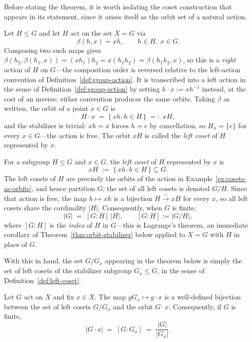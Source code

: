 \documentclass[mathematics,review,submit,moreauthors]{Definitions/mdpi}
\begin{document}
Before stating the theorem, it is worth isolating the coset construction
that appears in its statement, since it arises itself as the orbit set of a
natural action.

\begin{Example}
\label{ex:cosets-as-orbits}
Let $H \leq G$ and let $H$ act on the set $X = G$ via
\[
    \beta(h,x) = x h, \qquad h \in H,\ x \in G.
\]
Composing two such maps gives $\beta(h_2, \beta(h_1,x)) = (x h_1) h_2 = x(h_1 h_2) = \beta(h_1 h_2, x)$,
so this is a \emph{right} action of $H$ on $G$---the composition order is
reversed relative to the left-action convention of
Definition~\ref{def:group-action}. It is transcribed into a left action in
the sense of Definition~\ref{def:group-action} by setting
$h \cdot x := x h^{-1}$ instead, at the cost of an inverse; either
convention produces the same orbits. Taking $\beta$ as written, the orbit of
a point $x \in G$ is
\[
    H \cdot x \;=\; \{\, xh : h \in H \,\} \;=:\; xH,
\]
and the stabilizer is trivial: $xh = x$ forces $h = e$ by cancellation, so
$H_x = \{e\}$ for every $x \in G$---the action is free. The orbit $xH$ is
called the \emph{left coset} of $H$ represented by $x$.
\end{Example}

\begin{Definition}
\label{def:left-coset}
For a subgroup $H \leq G$ and $x \in G$, the \emph{left coset} of $H$
represented by $x$ is
\[
    xH \;:=\; \{\, xh : h \in H \,\} \subseteq G.
\]
The left cosets of $H$ are precisely the orbits of the action in
Example~\ref{ex:cosets-as-orbits}, and hence partition $G$; the set of all
left cosets is denoted $G/H$. Since that action is free, the map
$h \mapsto xh$ is a bijection $H \xrightarrow{\sim} xH$ for every $x$, so all
left cosets share the cardinality $|H|$. Consequently, when $G$ is finite,
\[
    |G| \;=\; [G:H]\,|H|, \qquad [G:H] := |G/H|,
\]
where $[G:H]$ is the \emph{index} of $H$ in $G$---this is Lagrange's
theorem, an immediate corollary of Theorem~\ref{thm:orbit-stabilizer} below
applied to $X = G$ with $H$ in place of $G$.
\end{Definition}

With this in hand, the set $G/G_x$ appearing in the theorem below is simply
the set of left cosets of the stabilizer subgroup $G_x \leq G$, in the sense
of Definition~\ref{def:left-coset}.

\begin{Theorem}
\label{thm:orbit-stabilizer}
Let $G$ act on $X$ and fix $x \in X$. The map $g G_x \mapsto g \cdot x$ is a
well-defined bijection between the set of left cosets $G / G_x$ and the
orbit $G \cdot x$. Consequently, if $G$ is finite,
\[
    |G \cdot x| \;=\; [G : G_x] \;=\; \frac{|G|}{|G_x|}.
\]
\end{Theorem}
\end{document}
